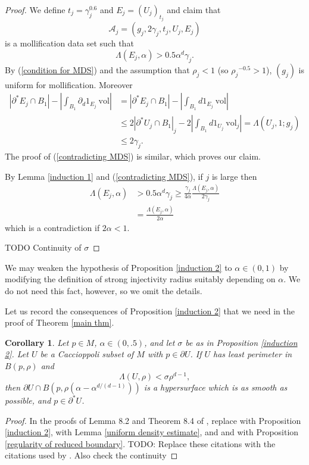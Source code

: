 \documentclass[reqno,12pt,letterpaper]{amsart}
\newcommand{\vol}{\mathrm{vol}}
\newtheorem{corollary}[theorem]{Corollary}
\theoremstyle{definition}
\numberwithin{equation}{section}
\begin{document}
\begin{proof}
We define $t_j = \gamma_j^{0.6}$ and $E_j = (U_j)_{t_j}$ and claim that
$$\mathcal A_j = (g_j, 2\gamma_j, t_j, U_j, E_j)$$
is a mollification data set such that
\begin{equation}
\label{contradicting MDS}
\Lambda(E_j, \alpha) > 0.5\alpha^d\gamma_j.
\end{equation}
By (\ref{condition for MDS}) and the assumption that $\rho_j < 1$ (so ${\rho_j}^{-0.5} > 1$), $(g_j)$ is uniform for mollification.
Moreover
\begin{align*}
|\partial^* E_j \cap B_1| - \left|\int_{B_1} \partial_d 1_{E_j} ~\vol\right| &= |\partial^* E_j \cap B_1| - \left|\int_{B_1} d1_{E_j} ~\vol\right| \\
&\leq 2|\partial^* U_j \cap B_1|_j - 2\left|\int_{B_1} d1_{U_j} ~\vol_j\right| = \Lambda(U_j, 1; g_j) \\
&\leq 2\gamma_j.
\end{align*}
The proof of (\ref{contradicting MDS}) is similar, which proves our claim.

By Lemma \ref{induction 1} and (\ref{contradicting MDS}), if $j$ is large then
\begin{align*}
\Lambda(E_j, \alpha) &> 0.5 \alpha^d \gamma_j \geq \frac{\gamma_j}{4\alpha} \frac{\Lambda(E_j, \alpha)}{2\gamma_j} \\
&= \frac{\Lambda(E_j, \alpha)}{2\alpha}
\end{align*}
which is a contradiction if $2\alpha < 1$.

TODO Continuity of $\sigma$
\end{proof}

We may weaken the hypothesis of Proposition \ref{induction 2} to $\alpha \in (0, 1)$ by modifying the definition of strong injectivity radius suitably depending on $\alpha$.
We do not need this fact, however, so we omit the details.

Let us record the consequences of Proposition \ref{induction 2} that we need in the proof of Theorem \ref{main thm}.

\begin{corollary}\label{tangent cones 1}
Let $p \in M$, $\alpha \in (0, .5)$, and let $\sigma$ be as in Proposition \ref{induction 2}.
Let $U$ be a Caccioppoli subset of $M$ with $p \in \partial U$.
If $U$ has least perimeter in $B(p, \rho)$ and
$$\Lambda(U, \rho) < \sigma \rho^{d - 1},$$
then $\partial U \cap B(p, \rho(\alpha - \alpha^{d/(d-1)}))$ is a hypersurface which is as smooth as possible, and $p \in \partial^* U$.
\end{corollary}
\begin{proof}
In the proofs of Lemma 8.2 and Theorem 8.4 of \cite{Giusti77}, replace \cite[Theorem 8.1]{Giusti77} with Proposition \ref{induction 2}, \cite[(5.16)]{Giusti77} with Lemma \ref{uniform density estimate},
and \cite[Theorem 4.11]{Giusti77} and \cite{morrey2009multiple} with Proposition \ref{regularity of reduced boundary}.
TODO: Replace these citations with the citations used by \cite[Teorema 4]{Miranda67}.
Also check the continuity
\end{proof}
\end{document}
